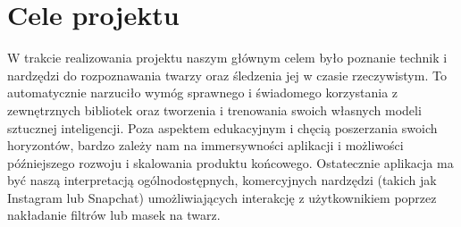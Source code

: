 \section{Cele projektu}
W trakcie realizowania projektu naszym głównym celem było poznanie technik i nardzędzi do rozpoznawania twarzy
oraz śledzenia jej w czasie rzeczywistym. To automatycznie narzuciło wymóg sprawnego i świadomego korzystania 
z zewnętrznych bibliotek oraz tworzenia i trenowania swoich własnych modeli sztucznej inteligencji. 
Poza aspektem edukacyjnym i chęcią poszerzania swoich horyzontów, bardzo zależy nam na immersywności aplikacji i możliwości
późniejszego rozwoju i skalowania produktu końcowego.
Ostatecznie aplikacja ma być naszą interpretacją ogólnodostępnych, komercyjnych nardzędzi (takich jak Instagram lub Snapchat)
umożliwiających interakcję z użytkownikiem poprzez nakładanie filtrów lub masek na twarz.

